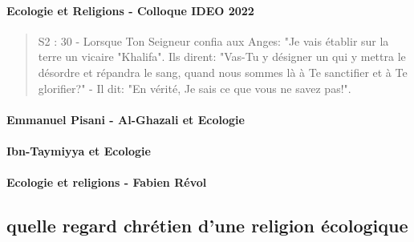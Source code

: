\paragraph{Ecologie et Religions - Colloque IDEO 2022 } \cite{pisani_ecologie_2022}

 
\begin{quote}

S2 : 30 - Lorsque Ton Seigneur confia aux Anges: "Je vais établir sur la terre un vicaire "Khalifa". Ils dirent: "Vas-Tu y désigner un qui y mettra le désordre et répandra le sang, quand nous sommes là à Te sanctifier et à Te glorifier?" - Il dit: "En vérité, Je sais ce que vous ne savez pas!".

\end{quote}
\label{Comment:MemoireISTR6}   





\paragraph{Emmanuel Pisani - Al-Ghazali et Ecologie} \cite{pisani_ecologie_2022} \cite{bouguignat_denys_revue_2023}

\label{theol:AlGazali25}
\label{Comment:MemoireISTR7}    




\paragraph{Ibn-Taymiyya et Ecologie} \cite{pisani_ecologie_2022}
 \label{Comment:MemoireISTR8}    


\paragraph{Ecologie et religions - Fabien Révol} \cite{pisani_ecologie_2022}
 \label{Comment:MemoireISTR9}   



\subsection{quelle regard chrétien d'une religion écologique}
 \label{Comment:MemoireISTR10} 


\newpage